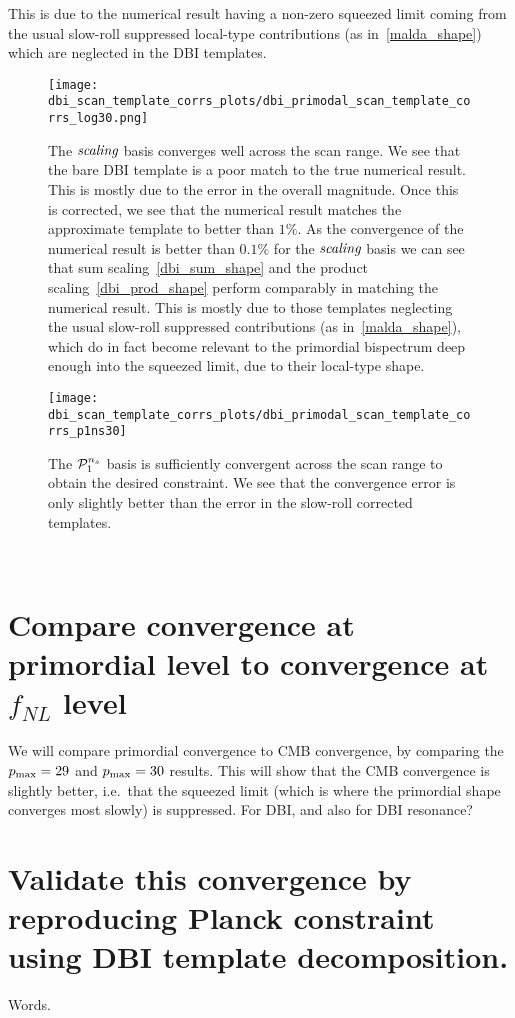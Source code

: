     This is due to the numerical result having a non-zero squeezed limit
    coming from the usual slow-roll suppressed local-type contributions
    (as in~\eqref{malda_shape}) which are neglected in the DBI templates.
    \\
\begin{figure}[!pth]
\centering
\texttt{[image: dbi\_scan\_template\_corrs\_plots/dbi\_primodal\_scan\_template\_corrs\_log30.png]}
\caption{
    The $\textit{scaling}$ basis converges well across the scan range.
    We see that the bare DBI template is a poor match to the true numerical result.
    This is mostly due to the error in the overall magnitude.
    Once this is corrected, we see that the numerical result matches the
    approximate template to better than $1\%$. As the convergence of the
    numerical result is better than $0.1\%$ for the $\textit{scaling}$ basis
    we can see that sum scaling~\eqref{dbi_sum_shape} and the
    product scaling~\eqref{dbi_prod_shape} perform
    comparably in matching the numerical result. This is mostly
    due to those templates neglecting the usual slow-roll suppressed
    contributions (as in~\eqref{malda_shape}),
    which do in fact become relevant to the primordial
    bispectrum deep enough into the squeezed limit, due to their local-type shape.
}\label{fig:dbi_primodal_scan_template_corrs_log30}
\end{figure}
\begin{figure}[!pth]
\centering
\texttt{[image: dbi\_scan\_template\_corrs\_plots/dbi\_primodal\_scan\_template\_corrs\_p1ns30]}
\caption{
    The $\mathcal{P}^{n_s}_1$ basis is sufficiently convergent across the scan range
    to obtain the desired constraint.
    We see that the convergence error is only slightly better than the error
    in the slow-roll corrected templates.
}\label{fig:dbi_primodal_scan_template_corrs_p1ns}
\end{figure}
    \\
\section{Compare convergence at primordial level to convergence at $f_{NL}$ level}
    We will compare primordial convergence to CMB convergence,
    by comparing the $p_\text{max}=29$ and $p_\text{max}=30$ results.
    This will show that the CMB convergence is slightly better, i.e.\ that
    the squeezed limit (which is where the primordial shape converges most slowly)
    is suppressed.
    For DBI, and also for DBI resonance?
\section{Validate this convergence by reproducing Planck constraint using DBI template decomposition.}
    Words.
